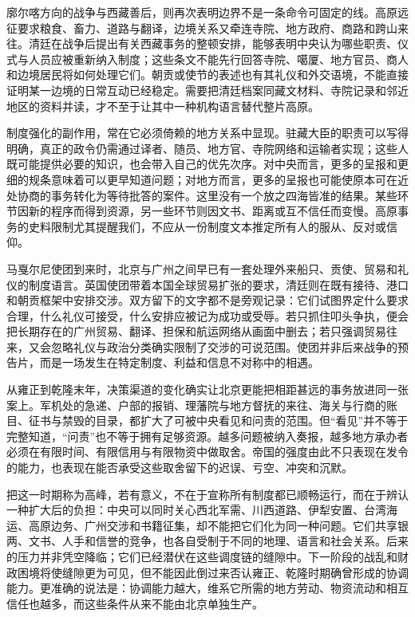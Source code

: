 廓尔喀方向的战争与西藏善后，则再次表明边界不是一条命令可固定的线。高原远征要求粮食、畜力、道路与翻译，边境关系又牵连寺院、地方政府、商路和跨山来往。清廷在战争后提出有关西藏事务的整顿安排，能够表明中央认为哪些职责、仪式与人员应被重新纳入制度；这些条文不能先行回答寺院、噶厦、地方官员、商人和边境居民将如何处理它们。朝贡或使节的表述也有其礼仪和外交语境，不能直接证明某一边境的日常互动已经稳定。需要把清廷档案同藏文材料、寺院记录和邻近地区的资料并读，才不至于让其中一种机构语言替代整片高原。

制度强化的副作用，常在它必须倚赖的地方关系中显现。驻藏大臣的职责可以写得明确，真正的政令仍需通过译者、随员、地方官、寺院网络和运输者实现；这些人既可能提供必要的知识，也会带入自己的优先次序。对中央而言，更多的呈报和更细的规条意味着可以更早知道问题；对地方而言，更多的呈报也可能使原本可在近处协商的事务转化为等待批答的案件。这里没有一个放之四海皆准的结果。某些环节因新的程序而得到资源，另一些环节则因文书、距离或互不信任而变慢。高原事务的史料限制尤其提醒我们，不应从一份制度文本推定所有人的服从、反对或信仰。

马戛尔尼使团到来时，北京与广州之间早已有一套处理外来船只、贡使、贸易和礼仪的制度语言。英国使团带着本国全球贸易扩张的要求，清廷则在既有接待、港口和朝贡框架中安排交涉。双方留下的文字都不是旁观记录：它们试图界定什么要求合理，什么礼仪可接受，什么安排应被记为成功或受辱。若只抓住叩头争执，便会把长期存在的广州贸易、翻译、担保和航运网络从画面中删去；若只强调贸易往来，又会忽略礼仪与政治分类确实限制了交涉的可说范围。使团并非后来战争的预告片，而是一场发生在特定制度、利益和信息不对称中的相遇。

从雍正到乾隆末年，决策渠道的变化确实让北京更能把相距甚远的事务放进同一张案上。军机处的急递、户部的报销、理藩院与地方督抚的来往、海关与行商的账目、征书与禁毁的目录，都扩大了可被中央看见和问责的范围。但“看见”并不等于完整知道，“问责”也不等于拥有足够资源。越多问题被纳入奏报，越多地方承办者必须在有限时间、有限信用与有限物资中做取舍。帝国的强度由此不只表现在发令的能力，也表现在能否承受这些取舍留下的迟误、亏空、冲突和沉默。

把这一时期称为高峰，若有意义，不在于宣称所有制度都已顺畅运行，而在于辨认一种扩大后的负担：中央可以同时关心西北军需、川西道路、伊犁安置、台湾海运、高原边务、广州交涉和书籍征集，却不能把它们化为同一种问题。它们共享银两、文书、人手和信誉的竞争，也各自受制于不同的地理、语言和社会关系。后来的压力并非凭空降临；它们已经潜伏在这些调度链的缝隙中。下一阶段的战乱和财政困境将使缝隙更为可见，但不能因此倒过来否认雍正、乾隆时期确曾形成的协调能力。更准确的说法是：协调能力越大，维系它所需的地方劳动、物资流动和相互信任也越多，而这些条件从来不能由北京单独生产。
